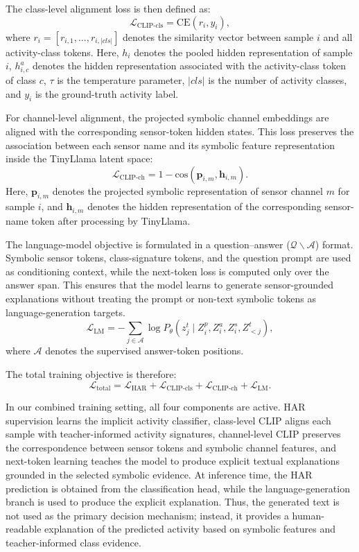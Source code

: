 \documentclass[preprint,12pt]{elsarticle}
\begin{document}
The class-level alignment loss is then defined as:
\[
\mathcal{L}_{\text{CLIP-cls}}
=
\mathrm{CE}
\left(
{r}_i,
y_i
\right),
\]
where ${r}_i = [r_{i,1},\ldots,r_{i,|cls|}]$ denotes the similarity vector between sample $i$ and all activity-class tokens. Here, ${h}_i$ denotes the pooled hidden representation of sample $i$, ${h}_{i,c}^{a}$ denotes the hidden representation associated with the activity-class token of class $c$, $\tau$ is the temperature parameter, $|cls|$ is the number of activity classes, and $y_i$ is the ground-truth activity label.

For channel-level alignment, the projected symbolic channel embeddings are aligned with the corresponding sensor-token hidden states. This loss preserves the association between each sensor name and its symbolic feature representation inside the TinyLlama latent space:
\[
\mathcal{L}_{\text{CLIP-ch}}
=
1 -
\mathrm{cos}
\left(
\mathbf{p}_{i,m},
\mathbf{h}_{i,m}
\right).
\]
Here, $\mathbf{p}_{i,m}$ denotes the projected symbolic representation of sensor channel $m$ for sample $i$, and $\mathbf{h}_{i,m}$ denotes the hidden representation of the corresponding sensor-name token after processing by TinyLlama.

The language-model objective is formulated in a question--answer ($\mathcal{Q} \backslash \mathcal{A}$) format. Symbolic sensor tokens, class-signature tokens, and the question prompt are used as conditioning context, while the next-token loss is computed only over the answer span. This ensures that the model learns to generate sensor-grounded explanations without treating the prompt or non-text symbolic tokens as language-generation targets.
\begin{equation}
\mathcal{L}_{\text{LM}}
=
- \sum_{j \in \mathcal{A}}
\log P_\theta(z^t_j \mid Z_i^{p}, Z_i^{a}, Z_i^{s}, Z^t_{<j}),
\end{equation}
where $\mathcal{A}$ denotes the supervised answer-token positions.

The total training objective is therefore:
\begin{equation}
\mathcal{L}_{\text{total}}
=
\mathcal{L}_{\text{HAR}}
+
\mathcal{L}_{\text{CLIP-cls}}
+
\mathcal{L}_{\text{CLIP-ch}}
+
\mathcal{L}_{\text{LM}}.
\end{equation}

In our combined training setting, all four components are active. HAR supervision learns the implicit activity classifier, class-level CLIP aligns each sample with teacher-informed activity signatures, channel-level CLIP preserves the correspondence between sensor tokens and symbolic channel features, and next-token learning teaches the model to produce explicit textual explanations grounded in the selected symbolic evidence. At inference time, the HAR prediction is obtained from the classification head, while the language-generation branch is used to produce the explicit explanation. Thus, the generated text is not used as the primary decision mechanism; instead, it provides a human-readable explanation of the predicted activity based on symbolic features and teacher-informed class evidence.
\end{document}
